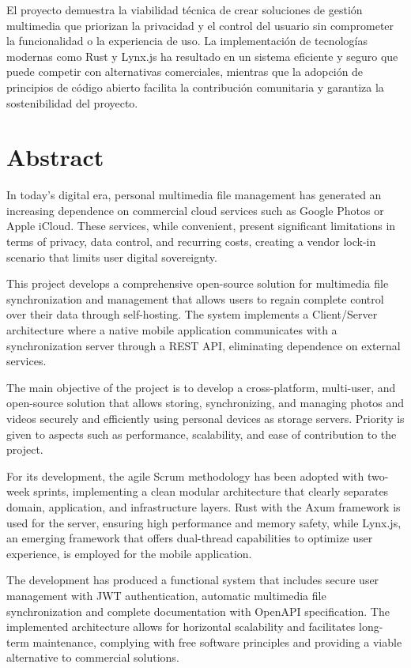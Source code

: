 El proyecto demuestra la viabilidad técnica de crear soluciones de gestión multimedia que priorizan la privacidad y el control del usuario sin comprometer la funcionalidad o la experiencia de uso. La implementación de tecnologías modernas como Rust y Lynx.js ha resultado en un sistema eficiente y seguro que puede competir con alternativas comerciales, mientras que la adopción de principios de código abierto facilita la contribución comunitaria y garantiza la sostenibilidad del proyecto.

\section*{Abstract}

In today's digital era, personal multimedia file management has generated an increasing dependence on commercial cloud services such as Google Photos or Apple iCloud. These services, while convenient, present significant limitations in terms of privacy, data control, and recurring costs, creating a vendor lock-in scenario that limits user digital sovereignty.

This project develops a comprehensive open-source solution for multimedia file synchronization and management that allows users to regain complete control over their data through self-hosting. The system implements a Client/Server architecture where a native mobile application communicates with a synchronization server through a REST API, eliminating dependence on external services.

The main objective of the project is to develop a cross-platform, multi-user, and open-source solution that allows storing, synchronizing, and managing photos and videos securely and efficiently using personal devices as storage servers. Priority is given to aspects such as performance, scalability, and ease of contribution to the project.

For its development, the agile Scrum methodology has been adopted with two-week sprints, implementing a clean modular architecture that clearly separates domain, application, and infrastructure layers. Rust with the Axum framework is used for the server, ensuring high performance and memory safety, while Lynx.js, an emerging framework that offers dual-thread capabilities to optimize user experience, is employed for the mobile application.

The development has produced a functional system that includes secure user management with JWT authentication, automatic multimedia file synchronization and complete documentation with OpenAPI specification. The implemented architecture allows for horizontal scalability and facilitates long-term maintenance, complying with free software principles and providing a viable alternative to commercial solutions.

